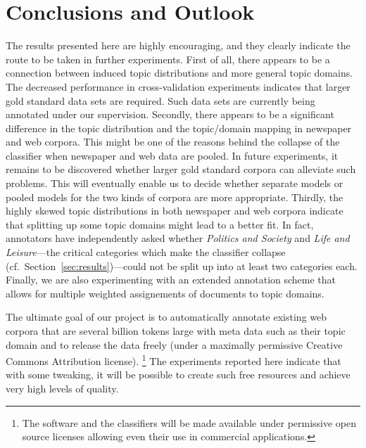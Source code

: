 \documentclass[11pt]{article}
\begin{document}
\section{Conclusions and Outlook}
\label{sec:conclusions}

The results presented here are highly encouraging, and they clearly indicate the route to be taken in further experiments.
First of all, there appears to be a connection between induced topic distributions and more general topic domains.
The decreased performance in cross-validation experiments indicates that larger gold standard data sets are required.
Such data sets are currently being annotated under our supervision.
Secondly, there appears to be a significant difference in the topic distribution and the topic\slash domain mapping in newspaper and web corpora.
This might be one of the reasons behind the collapse of the classifier when newspaper and web data are pooled.
In future experiments, it remains to be discovered whether larger gold standard corpora can alleviate such problems.
This will eventually enable us to decide whether separate models or pooled models for the two kinds of corpora are more appropriate.
Thirdly, the highly skewed topic distributions in both newspaper and web corpora indicate that splitting up some topic domains might lead to a better fit.
In fact, annotators have independently asked whether \textit{Politics and Society} and \textit{Life and Leisure}---the critical categories which make the classifier collapse (cf.\ Section~\ref{sec:results})---could not be split up into at least two categories each.
Finally, we are also experimenting with an extended annotation scheme that allows for multiple weighted assignements of documents to topic domains.

The ultimate goal of our project is to automatically annotate existing web corpora that are several billion tokens large with meta data such as their topic domain and to release the data freely (under a maximally permissive Creative Commons Attribution license).%
\footnote{The software and the classifiers will be made available under permissive open source licenses allowing even their use in commercial applications.}
The experiments reported here indicate that with some tweaking, it will be possible to create such free resources and achieve very high levels of quality.



\end{document}
